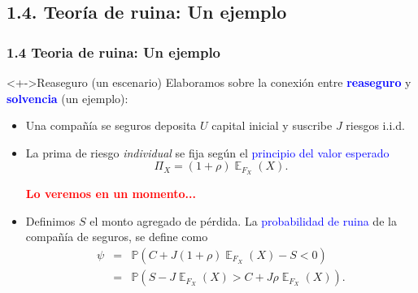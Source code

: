 \documentclass[cjk,t,compress]{beamer}
\newcommand{\field}[1]{\mathbb{#1}}
\renewcommand{\Pr}{\field{P}}
\newcommand{\expec}{\operatorname{\field{E}}}
\begin{document}
%
%
\subsection{1.4. Teor\'ia de ruina: Un ejemplo}
\begin{frame}[fragile]
	\frametitle{1.4 Teoria de ruina: Un ejemplo}
	\scriptsize  	
		
		\vspace{0.1cm}
		\begin{block}<+->{Reaseguro (un escenario)}
		\vspace{0.1cm}
		Elaboramos sobre la conexi\'on entre \textcolor{blue}{\bf reaseguro} y \textcolor{blue}{\bf solvencia} (un ejemplo):
		\begin{itemize}
		  \item Una compa\~n\'ia se seguros deposita $U$ capital inicial y suscribe $J$ riesgos i.i.d. 
		  \item La prima de riesgo {\it individual} se fija seg\'un el \textcolor{blue}{principio del valor esperado}
		  \begin{equation}
		  \Pi_X = (1 + \rho) \expec_{F_X}(X).
		  \end{equation}
		  
		  \textcolor{red}{\bf Lo veremos en un momento...}
		  \item Definimos $S$ el monto agregado de p\'erdida. La \textcolor{blue}{probabilidad de ruina} de la compa\~n\'ia de seguros, se define como
		  \begin{eqnarray}
		  \psi 
		    & = &
		    \Pr\left( C + J (1+\rho)\expec_{F_X}(X)-S < 0\right)
		    \nonumber \\
		    & = &
		    \Pr\left( S - J\expec_{F_X}(X) > C+ J\rho\expec_{F_X}(X) \right).
		    \nonumber
		  \end{eqnarray}
		\end{itemize}
		\end{block}
		
\end{frame}
\end{document}
